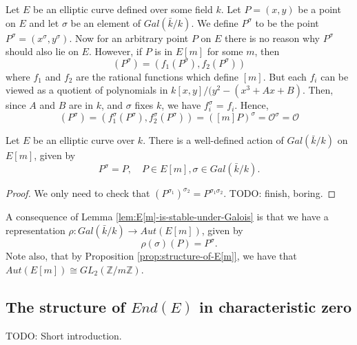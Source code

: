 Let $E$ be an elliptic curve defined over some field $k$.  Let $P = (x,y)$ be a point
on $E$ and let $\sigma$ be an element of $Gal(\bar{k} / k)$.  We define $P^{\sigma}$
to be the point $P^{\sigma} = (x^{\sigma},y^{\sigma})$.  Now for an arbitrary point
$P$ on $E$ there is no reason why $P^{\sigma}$ should also lie on $E$. However, if
$P$ is in $E[m]$ for some $m$, then
\begin{equation*}
  [m](P^{\sigma}) = (f_{1}(P^{\sigma}),f_{2} (P^{\sigma}))
\end{equation*}
where $f_{1}$ and $f_{2}$ are the rational functions which define $[m]$.  But each
$f_{i}$ can be viewed as a quotient of polynomials in $k[x,y] / (y^{2} - (x^{3} + Ax
+ B)$.  Then, since $A$ and $B$ are in $k$, and $\sigma$ fixes $k$, we have
$f_{i}^{\sigma}$ = $f_{i}$.  Hence,
\begin{equation*}
  [m](P^{\sigma}) = (f_{1}^{\sigma}(P^{\sigma}),f_{2}^{\sigma}(P^{\sigma})) =
  ([m]P)^{\sigma} = \mathcal{O}^{\sigma} = \mathscr{O}
\end{equation*}

\begin{lem}
  \label{lem:E[m]-is-stable-under-Galois}
  Let $E$ be an elliptic curve over $k$.  There is a well-defined action of
  $Gal(\bar{k} / k)$ on $E[m]$, given by
  \begin{equation*}
    P^{\sigma} = P, \quad P \in E[m], \sigma \in Gal(\bar{k} / k).
  \end{equation*}
\end{lem}
\begin{proof}
  We only need to check that $(P^{\sigma_{1}})^{\sigma_{2}} =
  P^{\sigma_{1}\sigma_{2}}$. TODO: finish, boring.
\end{proof}

A consequence of Lemma \ref{lem:E[m]-is-stable-under-Galois} is that we have a
representation $\rho : Gal(\bar{k} / k) \rightarrow Aut(E[m])$, given by
\begin{equation}
  \label{eq:Galois-representation}
  \rho (\sigma) (P) = P^{\sigma}.
\end{equation}
Note also, that by Proposition \ref{prop:structure-of-E[m]}, we have that $Aut(E[m])
\cong GL_{2}(\mathbb{Z} / m \mathbb{Z})$.
\subsection{The structure of $End(E)$ in characteristic zero}
\label{sec:struct-ende-char-zero}

TODO: Short introduction.

